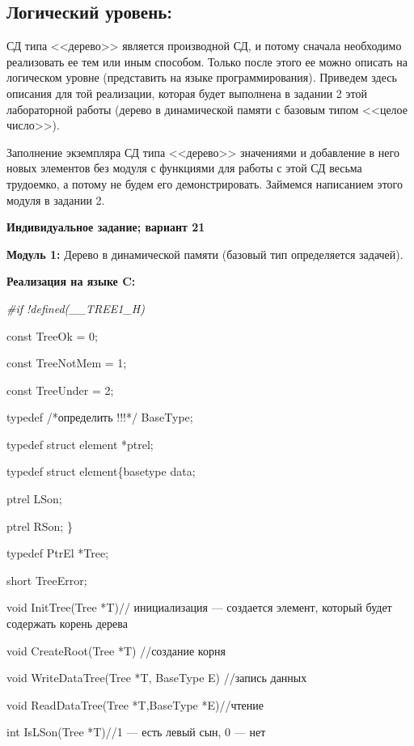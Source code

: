 \documentclass[12pt]{article}
\begin{document}
{	\subsection{Логический уровень:}
	\label{task_1_3}
	СД типа <<дерево>> является производной СД, и потому сначала необходимо реализовать ее тем или иным способом. Только после этого ее можно описать на логическом уровне (представить на языке программирования). Приведем здесь описания для той реализации, которая будет выполнена в задании 2 этой лабораторной работы (дерево в динамической памяти с базовым типом <<целое число>>).
	
	 
	
	Заполнение экземпляра СД типа <<дерево>> значениями и добавление в него новых элементов без модуля с функциями для работы с этой СД весьма трудоемко, а потому не будем его демонстрировать. Займемся написанием этого модуля в задании 2.
	
	\begin{center}
	{\bf Индивидуальное задание; вариант 21}
	\end{center}
	{\bf Модуль 1:} Дерево в динамической памяти (базовый тип определяется задачей).
	
	{\bf Реализация на языке C:}
	
	{\it \#if !defined(\_\_TREE1\_H)
		
		const TreeOk = 0;
		
		const TreeNotMem = 1;
		
		const TreeUnder = 2;
		
		typedef	/*определить !!!*/ BaseType;
		
		typedef struct element *ptrel;
		
		typedef struct element\{basetype data;
			
			ptrel LSon;
			
			ptrel RSon;
		\}
			
		typedef PtrEl *Tree;
		
		short TreeError;
		
		void InitTree(Tree *T)// инициализация — создается  элемент, который будет содержать корень дерева
		
		void CreateRoot(Tree *T) //создание корня
		
		void WriteDataTree(Tree *T, BaseType E) //запись данных
		
		void ReadDataTree(Tree *T,BaseType *E)//чтение
		
		int IsLSon(Tree *T)//1 — есть левый сын, 0 — нет 
		
}}
\end{document}
